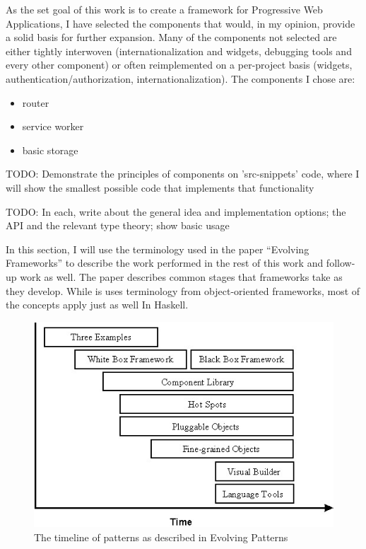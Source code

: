 \documentclass[english,odsaz]{fitthesis}
\begin{document}
As the set goal of this work is to create a framework for Progressive Web
Applications, I have selected the components that would, in my opinion, provide
a solid basis for further expansion. Many of the components not selected are
either tightly interwoven (internationalization and widgets, debugging tools and
every other component) or often reimplemented on a per-project basis (widgets,
authentication/authorization, internationalization). The components I chose are:
\begin{itemize}
\item router
\item service worker
\item basic storage
\end{itemize}

TODO: Demonstrate the principles of components on 'src-snippets' code, where
I will show the smallest possible code that implements that functionality

TODO: In each, write about the general idea and implementation options; the
API and the relevant type theory; show basic usage

In this section, I will use the terminology used in the paper ``Evolving Frameworks''
\cite{roberts1996evolving} to describe the work performed in the rest of this work
and follow-up work as well. The paper describes common stages that frameworks
take as they develop. While is uses terminology from object-oriented frameworks,
most of the concepts apply just as well In Haskell.

\begin{figure}[htbp]
\centering
\includegraphics[width=.9\linewidth]{./obrazky-figures/evolving-frameworks.jpg}
\caption{The timeline of patterns as described in Evolving Patterns}
\end{figure}
\end{document}
